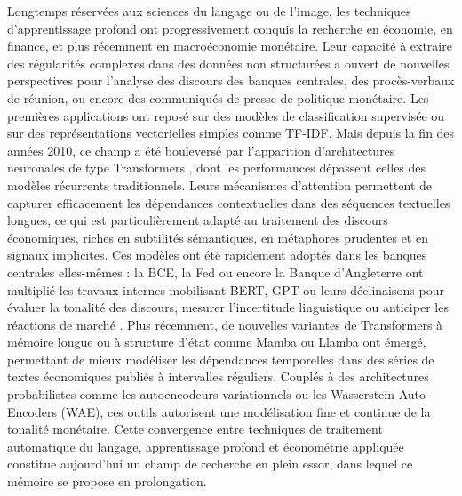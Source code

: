 Longtemps réservées aux sciences du langage ou de l’image, les techniques d’apprentissage profond ont progressivement conquis la recherche en économie, en finance, et plus récemment en macroéconomie monétaire. Leur capacité à extraire des régularités complexes dans des données non structurées a ouvert de nouvelles perspectives pour l’analyse des discours des banques centrales, des procès-verbaux de réunion, ou encore des communiqués de presse de politique monétaire. Les premières applications ont reposé sur des modèles de classification supervisée ou sur des représentations vectorielles simples comme TF-IDF. Mais depuis la fin des années 2010, ce champ a été bouleversé par l’apparition d’architectures neuronales de type Transformers \citep{vaswani2017attention}, dont les performances dépassent celles des modèles récurrents traditionnels. Leurs mécanismes d’attention permettent de capturer efficacement les dépendances contextuelles dans des séquences textuelles longues, ce qui est particulièrement adapté au traitement des discours économiques, riches en subtilités sémantiques, en métaphores prudentes et en signaux implicites. Ces modèles ont été rapidement adoptés dans les banques centrales elles-mêmes : la BCE, la Fed ou encore la Banque d’Angleterre ont multiplié les travaux internes mobilisant BERT, GPT ou leurs déclinaisons pour évaluer la tonalité des discours, mesurer l’incertitude linguistique ou anticiper les réactions de marché \citep{gali2008,hansen2016}. Plus récemment, de nouvelles variantes de Transformers à mémoire longue ou à structure d’état comme Mamba ou Llamba ont émergé, permettant de mieux modéliser les dépendances temporelles dans des séries de textes économiques publiés à intervalles réguliers. Couplés à des architectures probabilistes comme les autoencodeurs variationnels ou les Wasserstein Auto-Encoders (WAE), ces outils autorisent une modélisation fine et continue de la tonalité monétaire. Cette convergence entre techniques de traitement automatique du langage, apprentissage profond et économétrie appliquée constitue aujourd’hui un champ de recherche en plein essor, dans lequel ce mémoire se propose en prolongation.\\

